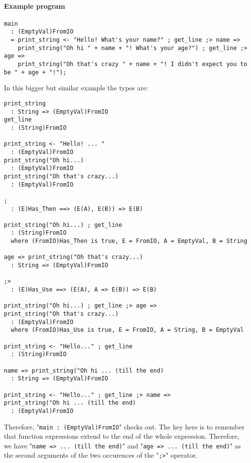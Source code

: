 \documentclass{article}
\begin{document}
\paragraph{Example program}
\begin{verbatim}
main
  : (EmptyVal)FromIO
  = print_string <- "Hello! What's your name?" ; get_line ;> name =>
    print_string("Oh hi " + name + "! What's your age?") ; get_line ;> age =>
    print_string("Oh that's crazy " + name + "! I didn't expect you to be " + age + "!");
\end{verbatim}
In this bigger but similar example the types are:
\begin{verbatim}
print_string
  : String => (EmptyVal)FromIO
get_line
  : (String)FromIO

print_string <- "Hello! ... "
  : (EmptyVal)FromIO
print_string("Oh hi...)
  : (EmptyVal)FromIO
print_string("Oh that's crazy...)
  : (EmptyVal)FromIO

;
  : (E)Has_Then ==> (E(A), E(B)) => E(B) 

print_string("Oh hi...) ; get_line
  : (String)FromIO
  where (FromIO)Has_Then is true, E = FromIO, A = EmptyVal, B = String

age => print_string("Oh that's crazy...)
  : String => (EmptyVal)FromIO

;>
  : (E)Has_Use ==> (E(A), A => E(B)) => E(B) 

print_string("Oh hi...) ; get_line ;> age =>
print_string("Oh that's crazy...)
  : (EmptyVal)FromIO
  where (FromIO)Has_Use is true, E = FromIO, A = String, B = EmptyVal

print_string <- "Hello..." ; get_line
  : (String)FromIO

name => print_string("Oh hi ... (till the end)
  : String => (EmptyVal)FromIO

print_string <- "Hello..." ; get_line ;> name =>
print_string("Oh hi ... (till the end)
  : (EmptyVal)FromIO
\end{verbatim}
Therefore, "\texttt{main\ :\ (EmptyVal)FromIO}" checks out.  The key here is
to remember that function expressions extend to the end of the whole
expression. Therefore, we have "\texttt{name => ... (till the end)}" and
"\texttt{age => ... (till the end)}" as the second arguments of the two
occurences of the "\texttt{;>}" operator. 
\end{document}
